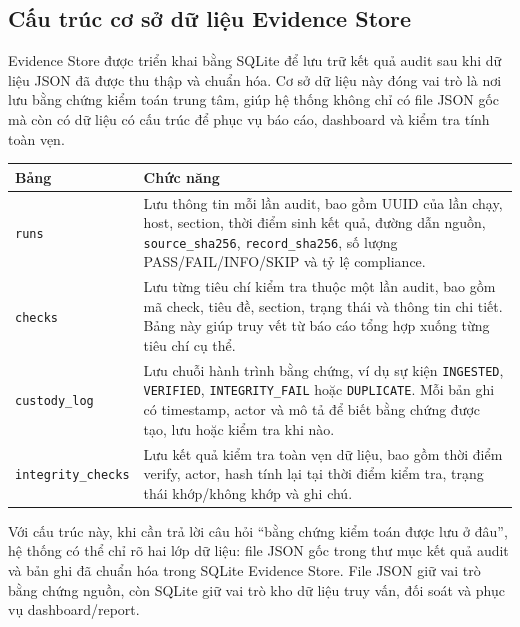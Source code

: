 \subsection{Cấu trúc cơ sở dữ liệu Evidence Store}\label{cau-truc-co-so-du-lieu-evidence-store}

Evidence Store được triển khai bằng SQLite để lưu trữ kết quả audit sau khi dữ liệu JSON đã được thu thập và chuẩn hóa. Cơ sở dữ liệu này đóng vai trò là nơi lưu bằng chứng kiểm toán trung tâm, giúp hệ thống không chỉ có file JSON gốc mà còn có dữ liệu có cấu trúc để phục vụ báo cáo, dashboard và kiểm tra tính toàn vẹn.

{\def\LTcaptype{none}
\begin{center}
\label{tab:cau-truc-evidence-store}
\end{center}
\begin{longtable}[]{@{}|
  >{\raggedright\arraybackslash}p{}|
  >{\raggedright\arraybackslash}p{}|@{}}
\hline
\textbf{Bảng} & \textbf{Chức năng} \\
\hline
\endhead
\texttt{runs} & Lưu thông tin mỗi lần audit, bao gồm UUID của lần chạy, host, section, thời điểm sinh kết quả, đường dẫn nguồn, \texttt{source\_sha256}, \texttt{record\_sha256}, số lượng PASS/FAIL/INFO/SKIP và tỷ lệ compliance. \\
\hline
\texttt{checks} & Lưu từng tiêu chí kiểm tra thuộc một lần audit, bao gồm mã check, tiêu đề, section, trạng thái và thông tin chi tiết. Bảng này giúp truy vết từ báo cáo tổng hợp xuống từng tiêu chí cụ thể. \\
\hline
\texttt{custody\_log} & Lưu chuỗi hành trình bằng chứng, ví dụ sự kiện \texttt{INGESTED}, \texttt{VERIFIED}, \texttt{INTEGRITY\_FAIL} hoặc \texttt{DUPLICATE}. Mỗi bản ghi có timestamp, actor và mô tả để biết bằng chứng được tạo, lưu hoặc kiểm tra khi nào. \\
\hline
\texttt{integrity\_checks} & Lưu kết quả kiểm tra toàn vẹn dữ liệu, bao gồm thời điểm verify, actor, hash tính lại tại thời điểm kiểm tra, trạng thái khớp/không khớp và ghi chú. \\
\hline
\end{longtable}
}

Với cấu trúc này, khi cần trả lời câu hỏi ``bằng chứng kiểm toán được lưu ở đâu'', hệ thống có thể chỉ rõ hai lớp dữ liệu: file JSON gốc trong thư mục kết quả audit và bản ghi đã chuẩn hóa trong SQLite Evidence Store. File JSON giữ vai trò bằng chứng nguồn, còn SQLite giữ vai trò kho dữ liệu truy vấn, đối soát và phục vụ dashboard/report.
